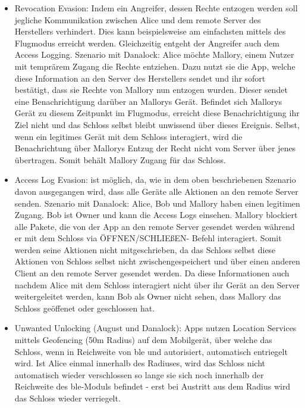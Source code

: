 \begin{itemize}
        \item Revocation Evasion: Indem ein Angreifer, dessen Rechte entzogen werden soll jegliche Kommunikation zwischen Alice und dem remote Server des Herstellers verhindert.
        Dies kann beispielsweise am einfachsten mittels des Flugmodus erreicht werden.
        Gleichzeitig entgeht der Angreifer auch dem Access Logging.
        Szenario mit Danalock: Alice möchte Mallory, einem Nutzer mit temprärem Zugang die Rechte entziehen. 
        Dazu nutzt sie die App, welche diese Information an den Server des Herstellers sendet und ihr sofort bestätigt, dass sie Rechte von Mallory nun entzogen wurden. 
        Dieser sendet eine Benachrichtigung darüber an Mallorys Gerät. 
        Befindet sich Mallorys Gerät zu diesem Zeitpunkt im Flugmodus, erreicht diese Benachrichtigung ihr Ziel nicht und das Schloss selbst bleibt unwissend über dieses Ereignis. 
        Selbst, wenn ein legitimes Gerät mit dem Schloss interagiert, wird die Benachrichtung über Mallorys Entzug der Recht nicht vom Server über jenes übertragen.
        Somit behält Mallory Zugang für das Schloss.
        \item Access Log Evasion: ist möglich, da, wie in dem oben beschriebenen Szenario davon ausgegangen wird, dass alle Geräte alle Aktionen an den remote Server senden.
        Szenario mit Danalock: Alice, Bob und Mallory haben einen legitimen Zugang.
        Bob ist Owner und kann die Access Logs einsehen.
        Mallory blockiert alle Pakete, die von der App an den remote Server gesendet werden während er mit dem Schloss via ÖFFNEN/SCHLIEßEN- Befehl interagiert.
        Somit werden seine Aktionen nicht mitgeschrieben, da das Schloss selbst diese Aktionen von Schloss selbst nicht zwischengespeichert und über einen anderen Client an den remote Server gesendet werden.
        Da diese Informationen auch nachdem Alice mit dem Schloss interagiert nicht über ihr Gerät an den Server weitergeleitet werden, kann Bob als Owner nicht sehen, dass Mallory das Schloss geöffenet oder geschlossen hat.
        \item Unwanted Unlocking (August und Danalock): Apps nutzen Location Services mittels Geofencing (50m Radius) auf dem Mobilgerät, über welche das Schloss, wenn in Reichweite von \gls{ble} und autorisiert, automatisch entriegelt wird.
        Ist Alice einmal innerhalb des Radiuses, wird das Schloss nicht automatisch wieder verschlossen so lange sie sich noch innerhalb der Reichweite des \gls{ble}-Moduls befindet - erst bei Austritt aus dem Radius wird das Schloss wieder verriegelt.

\end{itemize}

